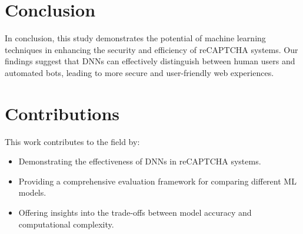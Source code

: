 \documentclass{article}
\begin{document}
\section{Conclusion}
\label{sec:conclusion}
In conclusion, this study demonstrates the potential of machine learning techniques in enhancing the security and efficiency of reCAPTCHA systems. Our findings suggest that DNNs can effectively distinguish between human users and automated bots, leading to more secure and user-friendly web experiences.

\section{Contributions}
\label{sec:contributions}
This work contributes to the field by:
\begin{itemize}
    \item Demonstrating the effectiveness of DNNs in reCAPTCHA systems.
    \item Providing a comprehensive evaluation framework for comparing different ML models.
    \item Offering insights into the trade-offs between model accuracy and computational complexity.
\end{itemize}



\end{document}

